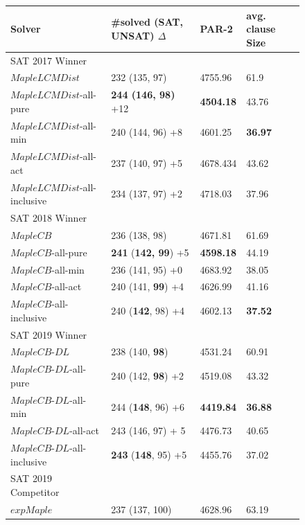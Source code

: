 \documentclass[runningheads]{llncs}
\newcommand{\fss}[2]{\fontsize{#1}{#2}\selectfont}
\newcommand{\MapleSeven}{\textit{MapleLCMDist}}
\newcommand{\MapleNineShort}{\textit{MapleCB-DL} }
\newcommand{\expSATShort}{\textit{expMaple} }
\newcommand{\MapleEightShort}{\textit{MapleCB}}
\begin{document}
\begin{figure} 
\begin{center}
\fss{8pt}{10pt}
\begin{tabular}{|l|l|l|l|} 
\hline
Solver & \#solved (SAT, UNSAT) $\Delta$ & PAR-2 & avg. clause Size \\ 
\hline
SAT 2017 Winner & & & \\
$\MapleSeven$ & 232 (135, 97) & 4755.96 & 61.9  \\ 
\hline
$\MapleSeven$-all-pure & \textbf{244 (146, 98)} +12 & \textbf{4504.18} & 43.76 \\
\hline
$\MapleSeven$-all-min & 240 (144, 96) +8 & 4601.25 & \textbf{36.97} \\ 
\hline
$\MapleSeven$-all-act & 237 (140, 97) +5 & 4678.434 & 43.62 \\ 
\hline
$\MapleSeven$-all-inclusive & 234 (137, 97) +2 & 4718.03 & 37.96 \\
\hline
\hline
SAT 2018 Winner & & & \\
$\MapleEightShort$ & 236 (138, 98) & 4671.81 & 61.69 \\
\hline
$\MapleEightShort$-all-pure & \textbf{241} (\textbf{142, 99}) +5 & \textbf{4598.18} & 44.19 \\
\hline
$\MapleEightShort$-all-min & 236 (141, 95) +0 & 4683.92 & 38.05 \\ 
\hline
$\MapleEightShort$-all-act & 240 (141, \textbf{99}) +4 & 4626.99 & 41.16 \\
\hline
$\MapleEightShort$-all-inclusive & 240 (\textbf{142}, 98) +4 & 4602.13 & \textbf{37.52} \\
\hline
\hline
SAT 2019 Winner & & & \\
$\MapleNineShort$ & 238 (140, \textbf{98}) & 4531.24 & 60.91 \\
\hline
$\MapleNineShort$-all-pure & 240 (142, \textbf{98}) +2 & 4519.08 &  43.32\\
\hline
$\MapleNineShort$-all-min & 244 (\textbf{148}, 96) +6 & \textbf{4419.84} & \textbf{36.88} \\
\hline
$\MapleNineShort$-all-act & 243 (146, 97) + 5 & 4476.73 & 40.65 \\
\hline
$\MapleNineShort$-all-inclusive & \textbf{243} (\textbf{148}, 95) +5 & 4455.76 & 37.02 \\
\hline
\hline
SAT 2019 Competitor & & &\\
$\expSATShort$ & 237 (137, 100)  & 4628.96 & 63.19 \\

\end{tabular}
\end{center}
\end{figure}
\end{document}
